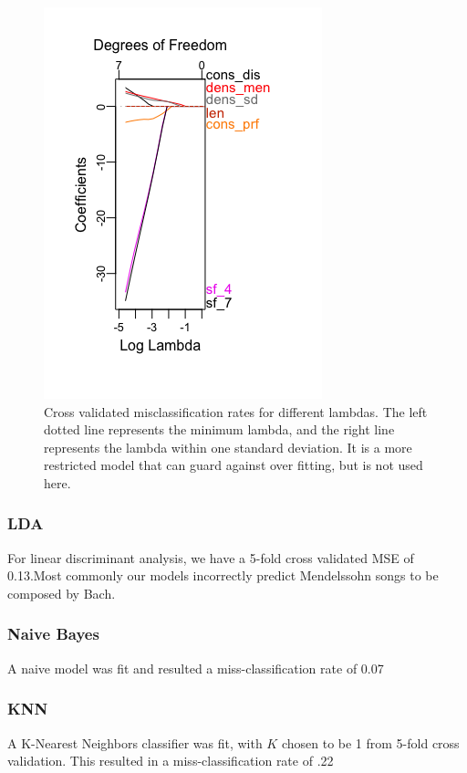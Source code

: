 \documentclass[12pt,twoside]{reedthesis}
\theoremstyle{definition}
\theoremstyle{definition}
\theoremstyle{definition}
\theoremstyle{remark}
\begin{document}
\begin{figure}[h]
\centering
\includegraphics[scale = .5]{images/lasso_bach.png}
\caption{Cross validated misclassification rates for different lambdas. The left dotted line represents the minimum lambda, and the right line represents the lambda within one standard deviation. It is a more restricted model that can guard against over fitting, but is not used here.}
\label{subd}
\end{figure}
\subsubsection{LDA}\label{lda}

For linear discriminant analysis, we have a 5-fold cross validated MSE
of 0.13.Most commonly our models incorrectly predict Mendelssohn songs
to be composed by Bach.

\subsubsection{Naive Bayes}\label{naive-bayes-1}

A naive model was fit and resulted a miss-classification rate of 0.07

\subsubsection{KNN}\label{knn}

A K-Nearest Neighbors classifier was fit, with \(K\) chosen to be 1 from
5-fold cross validation. This resulted in a miss-classification rate of
.22
\end{document}
